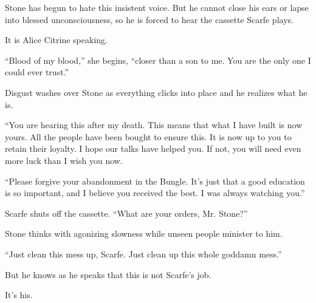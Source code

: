 Stone has begun to hate this insistent voice. But he cannot close his ears or lapse into blessed unconsciousness, so he is forced to hear the cassette Scarfe plays.

It is Alice Citrine speaking.

“Blood of my blood,” she begins, “closer than a son to me. You are the only one I could ever trust.”

Disgust washes over Stone as everything clicks into place and he realizes what he is.

“You are hearing this after my death. This means that what I have built is now yours. All the people have been bought to ensure this. It is now up to you to retain their loyalty. I hope our talks have helped you. If not, you will need even more luck than I wish you now.

“Please forgive your abandonment in the Bungle. It’s just that a good education is so important, and I believe you received the best. I was always watching you.”

Scarfe shuts off the cassette. “What are your orders, Mr. Stone?”

Stone thinks with agonizing slowness while unseen people minister to him.

“Just clean this mess up, Scarfe. Just clean up this whole goddamn mess.”

But he knows as he speaks that this is not Scarfe’s job.

It’s his.